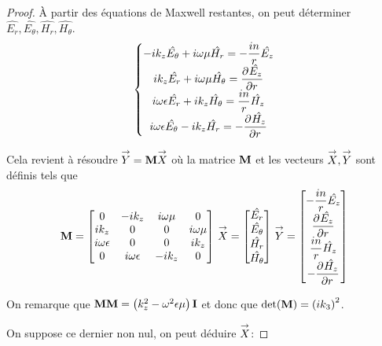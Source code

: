   \begin{proof}
    À partir des équations de Maxwell restantes, on peut déterminer \(\hat{E_r},\hat{E_\theta},\hat{H_r},\hat{H_\theta}\).
    \begin{equation}
      \left\lbrace
      \begin{matrix}
        -ik_z\hat{E_\theta} + i\w\mu \hat{H_r} = -\frac{in}{r}\hat{E_z}
        \\
        ik_z\hat{E_r} + i\w\mu \hat{H_\theta} = \ddr{r}{\hat{E_z}}
        \\
        i\w\eps \hat{E_r} + ik_z \hat{H_\theta} = \frac{in}{r}\hat{H_z}
        \\
        i\w\eps \hat{E_\theta} - ik_z \hat{H_r} = -\ddr{r}{\hat{H_z}}
      \end{matrix}
      \right.
    \end{equation}

    Cela revient à résoudre \(\vect{Y} = \mat{M}\vect{X}\) où la matrice \(\mat{M}\) et les vecteurs \(\vect{X}, \vect{Y}\) sont définis tels que
    \begin{equation}
      \mat{M} =
      \begin{bmatrix}
      0 & -ik_z & i\w\mu & 0
      \\
      ik_z & 0 & 0 & i\w\mu
      \\
      i\w\eps & 0 & 0 & ik_z
      \\
      0 & i\w\eps & -ik_z & 0
      \end{bmatrix}
      \,
      \vect{X} =
      \begin{bmatrix}
        \hat{E_r}\\
        \hat{E_\theta}\\
        \hat{H_r}\\
        \hat{H_\theta}
      \end{bmatrix}
      \,
      \vect{Y} =
      \begin{bmatrix}
        -\frac{in}{r}\hat{E_z}\\
        \ddr{r}{\hat{E_z}}\\
        \frac{in}{r}\hat{H_z}\\
        -\ddr{r}{\hat{H_z}}
      \end{bmatrix}
    \end{equation}

    On remarque que \(\mM\mM = \left(k_z^2 - \omega^2\eps\mu\right)\mI\) et donc que \(\det(\mat{M}) = \left(ik_3\right)^2\).

    On suppose ce dernier non nul, on peut déduire \(\vect{X}\):


\end{proof}
